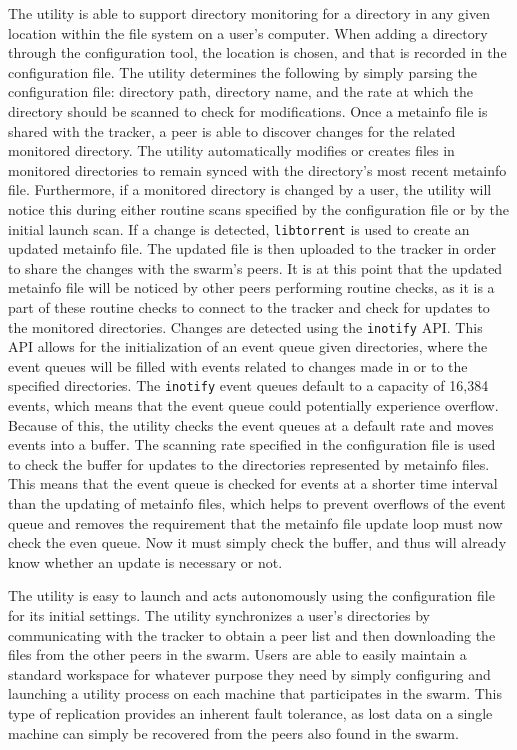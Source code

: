\documentclass[12 pt]{article}
\begin{document}
	The utility is able to support directory monitoring for a directory in any given location within the file system on a user's computer. When adding a directory through the configuration tool, the location is chosen, and that is recorded in the configuration file. The utility determines the following by simply parsing the configuration file: directory path, directory name, and the rate at which the directory should be scanned to check for modifications. Once a metainfo file is shared with the tracker, a peer is able to discover changes for the related monitored directory. The utility automatically modifies or creates files in monitored directories to remain synced with the directory's most recent metainfo file. Furthermore, if a monitored directory is changed by a user, the utility will notice this during either routine scans specified by the configuration file or by the initial launch scan. If a change is detected, \texttt{libtorrent} is used to create an updated metainfo file. The updated file is then uploaded to the tracker in order to share the changes with the swarm's peers. It is at this point that the updated metainfo file will be noticed by other peers performing routine checks, as it is a part of these routine checks to connect to the tracker and check for updates to the monitored directories. Changes are detected using the \texttt{inotify} API. This API allows for the initialization of an event queue given directories, where the event queues will be filled with events related to changes made in or to the specified directories. The \texttt{inotify} event queues default to a capacity of 16,384 events, which means that the event queue could potentially experience overflow. Because of this, the utility checks the event queues at a default rate and moves events into a buffer. The scanning rate specified in the configuration file is used to check the buffer for updates to the directories represented by metainfo files. This means that the event queue is checked for events at a shorter time interval than the updating of metainfo files, which helps to prevent overflows of the event queue and removes the requirement that the metainfo file update loop must now check the even queue. Now it must simply check the buffer, and thus will already know whether an update is necessary or not.
	
	The utility is easy to launch and acts autonomously using the configuration file for its initial settings. The utility synchronizes a user's directories by communicating with the tracker to obtain a peer list and then downloading the files from the other peers in the swarm. Users are able to easily maintain a standard workspace for whatever purpose they need by simply configuring and launching a utility process on each machine that participates in the swarm. This type of replication provides an inherent fault tolerance, as lost data on a single machine can simply be recovered from the peers also found in the swarm.
	
\end{document}
